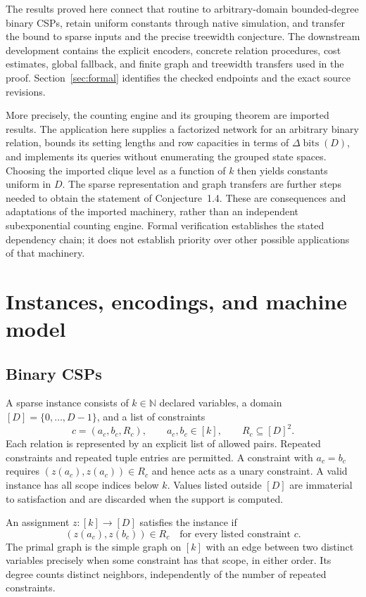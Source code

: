\documentclass[11pt,reqno]{amsart}
\numberwithin{equation}{section}
\theoremstyle{definition}
\theoremstyle{remark}
\newcommand{\bits}{\operatorname{bits}}
\newcommand{\N}{\mathbb N}
\begin{document}
The results proved here connect that routine to arbitrary-domain bounded-degree binary CSPs, retain uniform constants through native simulation, and transfer the bound to sparse inputs and the precise treewidth conjecture. The downstream development contains the explicit encoders, concrete relation procedures, cost estimates, global fallback, and finite graph and treewidth transfers used in the proof. Section~\ref{sec:formal} identifies the checked endpoints and the exact source revisions.

More precisely, the counting engine and its grouping theorem are imported results. The application here supplies a factorized network for an arbitrary binary relation, bounds its setting lengths and row capacities in terms of $\Delta\bits(D)$, and implements its queries without enumerating the grouped state spaces. Choosing the imported clique level as a function of $k$ then yields constants uniform in $D$. The sparse representation and graph transfers are further steps needed to obtain the statement of Conjecture~1.4. These are consequences and adaptations of the imported machinery, rather than an independent subexponential counting engine. Formal verification establishes the stated dependency chain; it does not establish priority over other possible applications of that machinery.

\section{Instances, encodings, and machine model}\label{sec:inputs}

\subsection{Binary CSPs}
A sparse instance consists of $k\in\N$ declared variables, a domain $[D]=\{0,\ldots,D-1\}$, and a list of constraints
\[
 c=(a_c,b_c,R_c),\qquad a_c,b_c\in[k],\qquad R_c\subseteq[D]^2.
\]
Each relation is represented by an explicit list of allowed pairs. Repeated constraints and repeated tuple entries are permitted. A constraint with $a_c=b_c$ requires $(z(a_c),z(a_c))\in R_c$ and hence acts as a unary constraint. A valid instance has all scope indices below $k$. Values listed outside $[D]$ are immaterial to satisfaction and are discarded when the support is computed.

An assignment $z:[k]\to[D]$ satisfies the instance if
\[
 (z(a_c),z(b_c))\in R_c
 \quad\text{for every listed constraint }c.
\]
The primal graph is the simple graph on $[k]$ with an edge between two distinct variables precisely when some constraint has that scope, in either order. Its degree counts distinct neighbors, independently of the number of repeated constraints.
\end{document}
